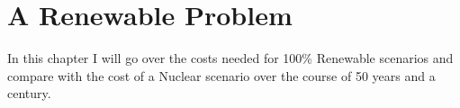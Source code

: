 \setchapterpreamble[u]{\margintoc}
\chapter{A Renewable Problem}

In this chapter I will go over the costs needed for 100\% Renewable scenarios and compare with the cost of a Nuclear scenario over the course of 50 years and a century. 